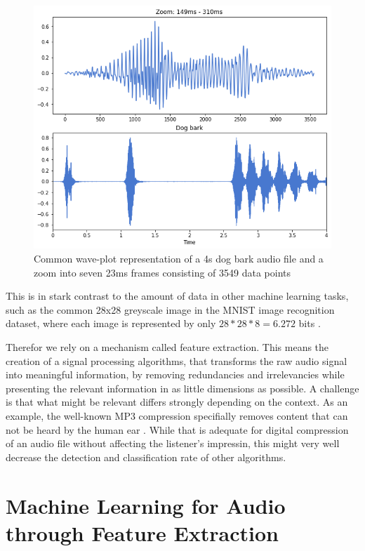 \begin{figure}[h]
    \centering
	\includegraphics[width=.85\textwidth]{./images/illustrations/audio-signal}
    \caption{Common wave-plot representation of a 4s dog bark audio file and a zoom into seven 23ms frames consisting of 3549 data points}
    \label{fig:audio}
\end{figure}


This is in stark contrast to the amount of data in other machine learning tasks, such as the common 28x28 greyscale image in the MNIST image recognition dataset, where each image is represented by only $28*28*8 = 6.272$ bits \cite{lecun1998mnist}.

Therefor we rely on a mechanism called feature extraction. This means the creation of a signal processing algorithms, that transforms the raw audio signal into meaningful information, by removing redundancies and irrelevancies while presenting the relevant information in as little dimensions as possible. A challenge is that what might be relevant differs strongly depending on the context. As an example, the well-known MP3 compression specifially removes content that can not be heard by the human ear \cite{brandenburg1999mp3}. While that is adequate for digital compression of an audio file without affecting the  listener's impressin, this might very well decrease the detection and classification rate of other algorithms.  


\section{Machine Learning for Audio through Feature Extraction}


